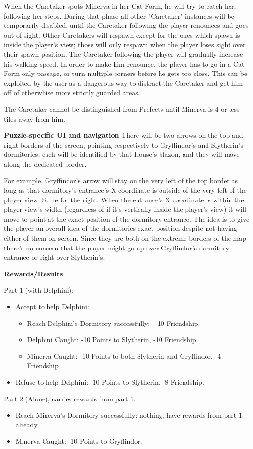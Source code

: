 When the Caretaker spots Minerva in her Cat-Form, he will try to catch her, following her steps. During that phase all other "Caretaker" instances will be temporarily disabled, until the Caretaker following the player renounces and goes out of sight. Other Caretakers will respawn except for the ones which spawn is inside the player's view; those will only respawn when the player loses sight over their spawn position. The Caretaker following the player will gradually increase his walking speed. In order to make him renounce, the player has to go in a Cat-Form only passage, or turn multiple corners before he gets too close. This can be exploited by the user as a dangerous way to distract the Caretaker and get him off of otherwhise more strictly guarded areas.

The Caretaker cannot be distinguished from Prefects until Minerva is 4 or less tiles away from him.

\textbf{Puzzle-specific UI and navigation}
There will be two arrows on the top and right borders of the screen, pointing respectively to Gryffindor's and Slytherin's dormitories; each will be identified by that House's blazon, and they will move along the dedicated border.

For example, Gryffindor's arrow will stay on the very left of the top border as long as that dormitory's entrance's X coordinate is outside of the very left of the player view. Same for the right. When the entrance's X coordinate is within the player view's width (regardless of if it's vertically inside the player's view) it will move to point at the exact position of the dormitory entrance. The idea is to give the player an overall idea of the dormitories exact position despite not having either of them on screen. Since they are both on the extreme borders of the map there's no concern that the player might go up over Gryffindor's dormitory entrance or right over Slytherin's.

\textbf{Rewards/Results}

Part 1 (with Delphini):

\begin{itemize}
    \item Accept to help Delphini:
	\begin{itemize}
		\item Reach Delphini's Dormitory successfully: +10 Friendship.
		\item Delphini Caught: -10 Points to Slytherin, -10 Friendship.
		\item Minerva Caught: -10 Points to both Slytherin and Gryffindor, -4 Friendship
	\end{itemize}
	\item Refuse to help Delphini: -10 Points to Slytherin, -8 Friendship.
\end{itemize}

Part 2 (Alone), carries rewards from part 1:

\begin{itemize}
	\item Reach Minerva's Dormitory successfully: nothing, have rewards from part 1 already.
	\item Minerva Caught: -10 Points to Gryffindor.
\end{itemize}
